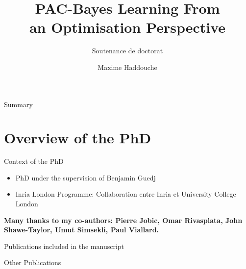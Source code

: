 \documentclass{presentation}
\title{PAC-Bayes Learning From\\ an Optimisation Perspective}
\subtitle{Soutenance de doctorat}
\author{\vspace{-1.5cm}
 Maxime Haddouche}
\institute{
\vspace{1.8cm}
Inria London\\
Université de Lille\\
}
\date{\vspace{0.5cm}

{\bf Mercredi 2 Octobre 2024}}
\begin{document}
\begin{xframe}{}
    \maketitle
\end{xframe}


\begin{xframe}{Summary}
    \tableofcontents
\end{xframe}

\section{Overview of the PhD}

    \begin{xframe}{Context of the PhD}
        \vspace{1cm}
        \begin{itemize}
            \item PhD under the supervision of Benjamin Guedj
            \item Inria London Programme: Collaboration entre Inria et University College London
        \end{itemize}
    \vspace{0.5cm}
        \begin{blackblock}{}
            {\bf \Large Many thanks to my co-authors: Pierre Jobic, Omar Rivasplata, John Shawe-Taylor, Umut Simsekli, Paul Viallard.}
        \end{blackblock}
    \end{xframe}

    \begin{frame}[allowframebreaks]{Publications included in the manuscript}
        \begin{refsection}
            \nocite{*}
            \printbibliography[heading={subbibliography}, keyword={conference}, title={Conference article}]
            \printbibliography[heading={subbibliography}, keyword={journal}, title={Journal article}]
            \printbibliography[heading={subbibliography}, keyword={report}, title={Research Report}]
            \end{refsection}
    \end{frame}

    \begin{frame}[allowframebreaks]{Other Publications}
        \begin{refsection}
            \nocite{*}
            \printbibliography[heading={subbibliography}, keyword={conference}, title={Conference article}]
            \printbibliography[heading={subbibliography}, keyword={journal}, title={Journal article}]
            \printbibliography[heading={subbibliography}, keyword={report}, title={Research Report}]
            \end{refsection}
    \end{frame}
\end{document}

